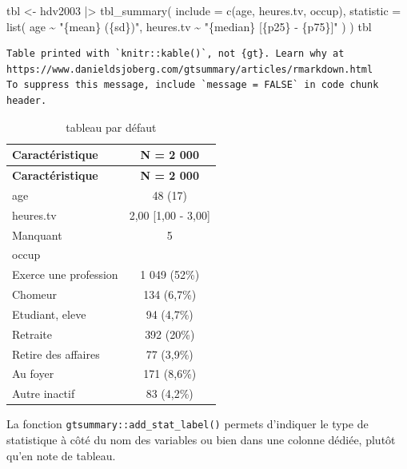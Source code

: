 \documentclass[
  letterpaper,
  DIV=11,
  numbers=noendperiod,
  oneside]{scrreprt}
\newenvironment{Shaded}{\begin{snugshade}}{\end{snugshade}}
\newcommand{\AttributeTok}[1]{\textcolor[rgb]{0.40,0.45,0.13}{#1}}
\newcommand{\FunctionTok}[1]{\textcolor[rgb]{0.28,0.35,0.67}{#1}}
\newcommand{\NormalTok}[1]{\textcolor[rgb]{0.00,0.23,0.31}{#1}}
\newcommand{\OtherTok}[1]{\textcolor[rgb]{0.00,0.23,0.31}{#1}}
\newcommand{\SpecialCharTok}[1]{\textcolor[rgb]{0.37,0.37,0.37}{#1}}
\newcommand{\StringTok}[1]{\textcolor[rgb]{0.13,0.47,0.30}{#1}}
\begin{document}
\begin{Shaded}
\begin{Highlighting}[]
\NormalTok{tbl }\OtherTok{\textless{}{-}}\NormalTok{ hdv2003 }\SpecialCharTok{|\textgreater{}}
  \FunctionTok{tbl\_summary}\NormalTok{(}
    \AttributeTok{include =} \FunctionTok{c}\NormalTok{(age, heures.tv, occup),}
    \AttributeTok{statistic =} \FunctionTok{list}\NormalTok{(}
\NormalTok{      age }\SpecialCharTok{\textasciitilde{}} \StringTok{"\{mean\} (\{sd\})"}\NormalTok{,}
\NormalTok{      heures.tv }\SpecialCharTok{\textasciitilde{}} \StringTok{"\{median\} [\{p25\} {-} \{p75\}]"}
\NormalTok{    )}
\NormalTok{  )}
\NormalTok{tbl}
\end{Highlighting}
\end{Shaded}

\begin{verbatim}
Table printed with `knitr::kable()`, not {gt}. Learn why at
https://www.danieldsjoberg.com/gtsummary/articles/rmarkdown.html
To suppress this message, include `message = FALSE` in code chunk header.
\end{verbatim}

\hypertarget{tbl-stat-nom}{}
\begin{longtable}[]{@{}lc@{}}
\caption{\label{tbl-stat-nom}tableau par défaut}\tabularnewline
\toprule()
\textbf{Caractéristique} & \textbf{N = 2 000} \\
\midrule()
\endfirsthead
\toprule()
\textbf{Caractéristique} & \textbf{N = 2 000} \\
\midrule()
\endhead
age & 48 (17) \\
heures.tv & 2,00 {[}1,00 - 3,00{]} \\
Manquant & 5 \\
occup & \\
Exerce une profession & 1 049 (52\%) \\
Chomeur & 134 (6,7\%) \\
Etudiant, eleve & 94 (4,7\%) \\
Retraite & 392 (20\%) \\
Retire des affaires & 77 (3,9\%) \\
Au foyer & 171 (8,6\%) \\
Autre inactif & 83 (4,2\%) \\
\bottomrule()
\end{longtable}

La fonction \texttt{gtsummary::add\_stat\_label()} permets d'indiquer le
type de statistique à côté du nom des variables ou bien dans une colonne
dédiée, plutôt qu'en note de tableau.
\end{document}
